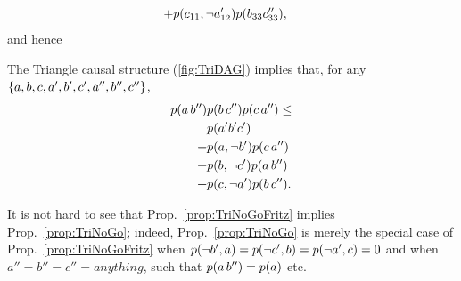\begin{EDITING...}
\begin{align}
\begin{split}
\\+&\p{c_{11},\na'_{12}}\p{b_{33} c''_{33}},
\end{split}\end{align}
and hence
\begin{prop} \label{prop:TriNoGoFritz}
The Triangle causal structure (\cref{fig:TriDAG}) implies that, for any $\left\lbrace a,b,c,a',b',c',a'',b'',c''\right\rbrace$,
\begin{align}\begin{split}\label{eq:fourtermineq}
\p{a\, b''}&\p{b\, c''}\p{c\, a''}\leq
\\ &\p{a' b' c'}
\\+&\p{a,\nb'}\p{c\, a''}
\\+&\p{b,\nc'}\p{a\, b''}
\\+&\p{c,\na'}\p{b\, c''}.
\end{split}\end{align}
\end{prop}
It is not hard to see that Prop.~\ref{prop:TriNoGoFritz} implies Prop.~\ref{prop:TriNoGo}; indeed, Prop.~\ref{prop:TriNoGo} is merely the special case of Prop.~\ref{prop:TriNoGoFritz} when $\p{\nb', a}=\p{\nc', b}=\p{\na', c}=0$ and when $a''=b''=c''= anything$, such that $\p{a\, b''}=\p{a}$ etc.



\end{EDITING...}
